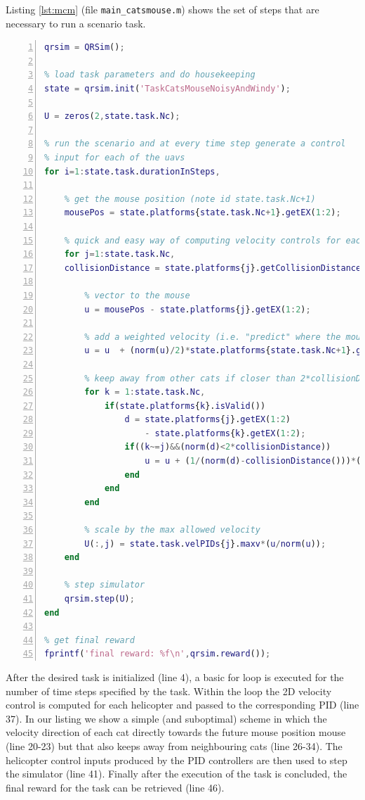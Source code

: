 \documentclass[a4paper,11pt]{report}
\begin{document}
Listing \ref{lst:mcm} (file \texttt{main\_catsmouse.m}) shows the set of steps that are necessary to run a scenario task.
\begin{lstlisting}[float=ht!bp,caption=main\_catsmouse.m,language=Matlab,frame=lines,label=lst:mcm,numbers=left,basicstyle=\small]
qrsim = QRSim();

% load task parameters and do housekeeping
state = qrsim.init('TaskCatsMouseNoisyAndWindy');

U = zeros(2,state.task.Nc);

% run the scenario and at every time step generate a control
% input for each of the uavs
for i=1:state.task.durationInSteps,
    
    % get the mouse position (note id state.task.Nc+1)
    mousePos = state.platforms{state.task.Nc+1}.getEX(1:2);
    
    % quick and easy way of computing velocity controls for each cat 
    for j=1:state.task.Nc,
	collisionDistance = state.platforms{j}.getCollisionDistance();
		
        % vector to the mouse
        u = mousePos - state.platforms{j}.getEX(1:2);
        
        % add a weighted velocity (i.e. "predict" where the mouse will be)
        u = u  + (norm(u)/2)*state.platforms{state.task.Nc+1}.getEX(18:19);
        
        % keep away from other cats if closer than 2*collisionDistance        
        for k = 1:state.task.Nc,
            if(state.platforms{k}.isValid())                  
                d = state.platforms{j}.getEX(1:2) 
                    - state.platforms{k}.getEX(1:2);
                if((k~=j)&&(norm(d)<2*collisionDistance))
                    u = u + (1/(norm(d)-collisionDistance()))*(d/norm(d));
                end
            end
        end
        
        % scale by the max allowed velocity
        U(:,j) = state.task.velPIDs{j}.maxv*(u/norm(u));
    end
    
    % step simulator
    qrsim.step(U);
end

% get final reward
fprintf('final reward: %f\n',qrsim.reward());

\end{lstlisting}

After the desired task is initialized (line 4), a basic for loop is executed for the number of time steps specified by the task. Within the loop the 2D velocity control is computed for each helicopter and passed to the corresponding PID (line 37). 
In our listing we show a simple (and suboptimal) scheme in which the velocity direction of each cat directly towards the future mouse position mouse (line 20-23) but that also keeps away from neighbouring cats (line 26-34). 
The helicopter control inputs produced by the PID controllers are then used to step the simulator (line 41).
Finally after the execution of the task is concluded, the final reward for the task can be retrieved (line 46).
\end{document}
